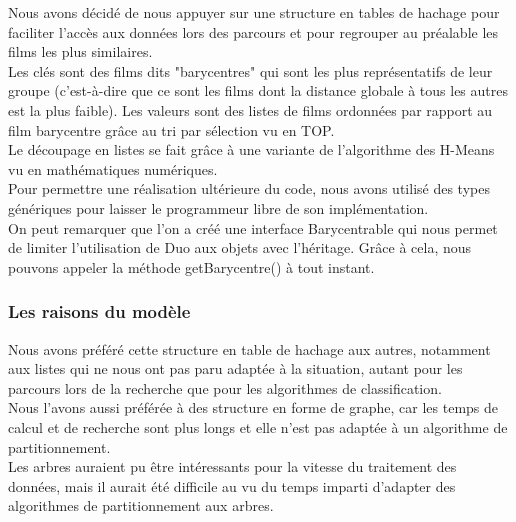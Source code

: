 Nous avons décidé de nous appuyer sur une structure en tables de hachage pour faciliter l'accès aux données lors des parcours et pour regrouper au préalable les films les plus similaires. \\
Les clés sont des films dits "barycentres" qui sont les plus représentatifs de leur groupe (c'est-à-dire que ce sont les films dont la distance globale à tous les autres est la plus faible). Les valeurs sont des listes de films ordonnées par rapport au film barycentre grâce au tri par sélection vu en TOP. \\
Le découpage en listes se fait grâce à une variante de l'algorithme des H-Means vu en mathématiques numériques. \\
Pour permettre une réalisation ultérieure du code, nous avons utilisé des types génériques pour laisser le programmeur libre de son implémentation. \\
On peut remarquer que l'on a créé une interface Barycentrable qui nous permet de limiter l'utilisation de Duo aux objets avec l'héritage.
Grâce à cela, nous pouvons appeler la méthode getBarycentre() à tout instant. \\

\subsubsection{Les raisons du modèle}

Nous avons préféré cette structure en table de hachage aux autres, notamment aux listes qui ne nous ont pas paru adaptée à la situation, autant pour les parcours lors de la recherche que pour les algorithmes de classification. \\
Nous l'avons aussi préférée à des structure en forme de graphe, car les temps de calcul et de recherche sont plus longs et elle n'est pas adaptée à un algorithme de partitionnement. \\
Les arbres auraient pu être intéressants pour la vitesse du traitement des données, mais il aurait été difficile au vu du temps imparti d'adapter des algorithmes de partitionnement aux arbres. 
